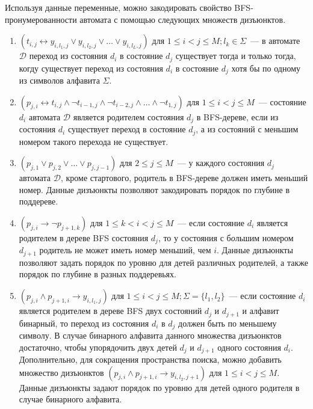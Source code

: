 Используя данные переменные, можно закодировать свойство BFS-пронумерованности автомата с помощью следующих множеств дизъюнктов.

\begin{enumerate}
  \item $\left(t_{i,j} \leftrightarrow y_{i,l_{1},j} \vee y_{i,l_{2},j} \vee \ldots \vee y_{i,l_{L},j} \right)$ для $1 \leq i < j \leq M; l_{k} \in \Sigma$~--- в автомате $\mathcal{D}$ переход из состояния $d_{i}$ в состояние $d_{j}$ существует тогда и только тогда, когду существует переход из состояния $d_{i}$ в состояние $d_{j}$ хотя бы по одному из символов алфавита $\Sigma$.
  
  \item $\left(p_{j,i} \leftrightarrow t_{i,j} \wedge \neg t_{i - 1,j} \wedge \neg t_{i - 2, j} \wedge \ldots \wedge \neg t_{1,j}\right)$ для $1 \leq i < j \leq M$~{---} состояние $d_{i}$ автомата $\mathcal{D}$ является родителем состояния $d_{j}$ в BFS-дереве, если из состояния $d_{i}$ существует переход в состояние $d_{j}$, а из состояний с меньшим номером такого перехода не существует.
  
  \item $\left(p_{j,1} \vee p_{j,2} \vee \ldots \vee p_{j,j - 1}\right)$ для $2 \leq j \leq M$~{---} у каждого состояния $d_{j}$ автомата $\mathcal{D}$, кроме стартового, родитель в BFS-дереве должен иметь меньший номер. 
  Данные дизъюнкты позволяют закодировать порядок по глубине в поддереве.

  \item $\left(p_{j,i} \rightarrow \neg p_{j + 1, k}\right)$ для $1 \leq k < i < j \leq M$~{---} если состояние $d_{i}$ является родителем в дереве BFS состояния $d_{j}$, то у состояния с б\emph{о}льшим номером $d_{j + 1}$ родитель не может иметь номер меньший, чем $i$. 
  Данные дизъюнкты позволяют задать порядок по уровню для детей различных родителей, а также порядок по глубине в разных поддеревьях.
  
  \item $\left(p_{j,i} \wedge p_{j + 1, i} \rightarrow y_{i,l_{1},j}\right)$ для $1 \leq i < j \leq M;\Sigma=\{l_{1},l_{2}\}$~{---} если состояние $d_i$ является родителем в дереве BFS двух состояний $d_{j}$ и $d_{j+1}$ и алфавит бинарный, то переход из состояния $d_{i}$ в $d_{j}$ должен быть по меньшему символу.
  В случае бинарного алфавита данного множества дизъюнктов достаточно, чтобы упорядочить двух детей $d_{j}$ и $d_{j + 1}$ одного состояния $d_{i}$. 
  Дополнительно, для сокращения пространства поиска, можно добавить множество дизъюнктов $\left(p_{j,i} \wedge p_{j + 1, i} \rightarrow y_{i,l_{2},j + 1}\right)$ для $1 \leq i < j \leq M$. 
  Данные дизъюнкты задают порядок по уровню для детей одного родителя в случае бинарного алфавита.


\end{enumerate}
